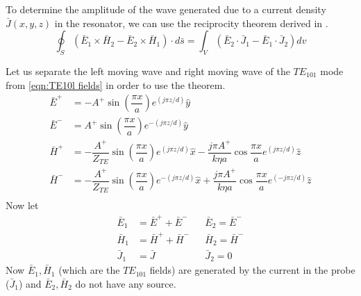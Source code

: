 \iffalse


To determine the amplitude of the wave generated due to a current density $\bar{J}(x,y,z)$ in the resonator, we can use the reciprocity theorem derived in \cite{Pozar2009}.
\begin{equation}
\label{eqn:reciprocity Th}
\oint_S \left( \bar{E}_1 \times\bar{H}_2 - \bar{E}_2 \times\bar{H}_1\right)\cdot d\bar{s}=\int_V \left(\bar{E}_2\cdot\bar{J}_1 - \bar{E}_1\cdot\bar{J}_2\right)dv
\end{equation}

Let us separate the left moving wave and right moving wave of the $TE_{101}$ mode from \ref{eqn:TE10l fields} in order to use the theorem.
\begin{subequations}
\begin{align}
\bar{E}^+&=-A^+\sin\left(\dfrac{\pi x}{a}\right)e^{(j\pi z/d)} \hat{y}\\
\bar{E}^-&=A^+\sin\left(\dfrac{\pi x}{a}\right)e^{-(j\pi z/d)} \hat{y}\\
\bar{H}^+&=-\dfrac{A^+}{Z_{TE}}\sin\left(\dfrac{\pi x}{a}\right)e^{(j\pi z/d)} \hat{x}-\dfrac{j\pi A^+}{k\eta a}\cos\dfrac{\pi x}{a}e^{(j\pi z/d)} \hat{z}\\
\bar{H}^-&=-\dfrac{A^+}{Z_{TE}}\sin\left(\dfrac{\pi x}{a}\right)e^{-(j\pi z/d)} \hat{x}+\dfrac{j\pi A^+}{k\eta a}\cos\dfrac{\pi x}{a}e^{(-j\pi z/d)} \hat{z}\\
\end{align}
\end{subequations}
Now let
\begin{align}
\bar{E}_1&=\bar{E}^++\bar{E}^-&&\bar{E}_2=\bar{E}^-\\
\bar{H}_1&=\bar{H}^++\bar{H}^-&&\bar{H}_2=\bar{H}^-\\
\bar{J}_1&=\bar{J}&&\bar{J}_2=0
\end{align}
Now $\bar{E}_1,\bar{H}_1$ (which are the $TE_{101}$ fields) are generated by the current in the probe ($\bar{J}_1$) and $\bar{E}_2,\bar{H}_2$ do not have any source.

